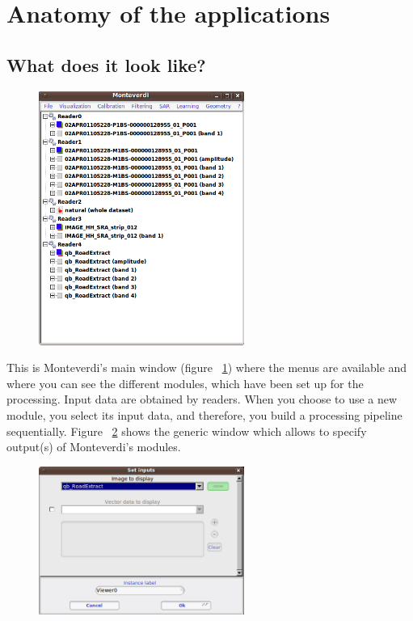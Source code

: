 \section{Anatomy of the applications}\label{sec:anatomy}

\subsection{What does it look like?}

\begin{figure}
  \center
  \includegraphics[width=0.6\textwidth]{../Art/MonteverdiImages/monteverdi_mainwindow.png}
  \label{fig:mainwindow}
\end{figure}

This is Monteverdi's main window (figure ~\ref{fig:mainwindow}) where the
menus are available and where you can see the different modules, which
have been set up for the processing. Input data are obtained by
readers. When you choose to use a new module, you select its input
data, and therefore, you build a processing pipeline sequentially.
Figure ~\ref{fig:inputswindow} shows the generic window which allows to
specify output(s) of Monteverdi's modules.  

\begin{figure} 
  \center
  \includegraphics[width=0.6\textwidth]{../Art/MonteverdiImages/monteverdi_inputs_window.png}
    \label{fig:inputswindow} 
\end{figure} 

